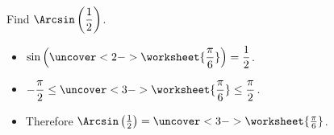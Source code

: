 \begin{frame}
\vskip -0.1cm
\begin{example}
\hfil \hfil Find $\displaystyle \Arcsin \left(\frac{1}{2}\right)$.
\begin{itemize}
\item<2-> $\displaystyle \sin \left(\uncover<2->{\worksheet{\frac{\pi}{ 6}}}\right) = \frac{1}{2}$.
\item<3-> $\displaystyle -\frac{\pi}{2} \leq \uncover<3->{\worksheet{\frac{\pi }{6}}} \leq \frac{\pi}{2}$.
\item<4-> Therefore $ \Arcsin \left( \frac{1}{2}\right) = \uncover<3->{ \worksheet{\frac{ \pi }{6} }}$.
\end{itemize}
\end{example}
\end{frame}
